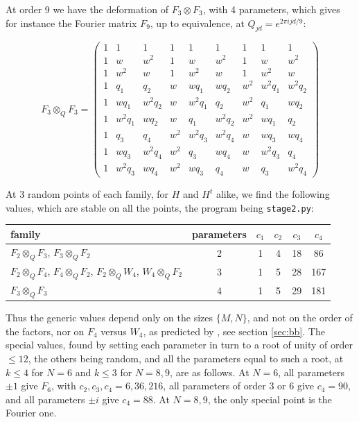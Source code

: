 \documentclass[11pt]{amsart}
\begin{document}
\noindent At order 9 we have the deformation of $F_3\otimes F_3$, with 4 parameters, which gives for instance the Fourier matrix $F_9$, up to equivalence, at $Q_{jd}=e^{2\pi ijd/9}$:

{\small\setlength{\arraycolsep}{3pt}$$F_3\otimes_QF_3=\begin{pmatrix}1 & 1 & 1 & 1 & 1 & 1 & 1 & 1 & 1\\ 1 & w & w^2 & 1 & w & w^2 & 1 & w & w^2\\ 1 & w^2 & w & 1 & w^2 & w & 1 & w^2 & w\\ 1 & q_{1} & q_{2} & w & wq_{1} & wq_{2} & w^2 & w^2q_{1} & w^2q_{2}\\ 1 & wq_{1} & w^2q_{2} & w & w^2q_{1} & q_{2} & w^2 & q_{1} & wq_{2}\\ 1 & w^2q_{1} & wq_{2} & w & q_{1} & w^2q_{2} & w^2 & wq_{1} & q_{2}\\ 1 & q_{3} & q_{4} & w^2 & w^2q_{3} & w^2q_{4} & w & wq_{3} & wq_{4}\\ 1 & wq_{3} & w^2q_{4} & w^2 & q_{3} & wq_{4} & w & w^2q_{3} & q_{4}\\ 1 & w^2q_{3} & wq_{4} & w^2 & wq_{3} & q_{4} & w & q_{3} & w^2q_{4}\end{pmatrix}$$}

\noindent At 3 random points of each family, for $H$ and $H^t$ alike, we find the following values, which are stable on all the points, the program being \texttt{stage2.py}:

\medskip

\begin{center}
\begin{tabular}{lccccc}
\toprule
family & parameters & $c_1$ & $c_2$ & $c_3$ & $c_4$\\
\midrule
$F_2\otimes_QF_3$, $F_3\otimes_QF_2$ & 2 & 1 & 4 & 18 & 86\\
$F_2\otimes_QF_4$, $F_4\otimes_QF_2$, $F_2\otimes_QW_4$, $W_4\otimes_QF_2$ & 3 & 1 & 5 & 28 & 167\\
$F_3\otimes_QF_3$ & 4 & 1 & 5 & 29 & 181\\
\bottomrule
\end{tabular}
\end{center}

\medskip

\noindent Thus the generic values depend only on the sizes $\{M,N\}$, and not on the order of the factors, nor on $F_4$ versus $W_4$, as predicted by \cite{bb3}, see section \ref{sec:bb}. The special values, found by setting each parameter in turn to a root of unity of order $\leq12$, the others being random, and all the parameters equal to such a root, at $k\leq4$ for $N=6$ and $k\leq3$ for $N=8,9$, are as follows. At $N=6$, all parameters $\pm1$ give $F_6$, with $c_2,c_3,c_4=6,36,216$, all parameters of order 3 or 6 give $c_4=90$, and all parameters $\pm i$ give $c_4=88$. At $N=8,9$, the only special point is the Fourier one.
\end{document}
